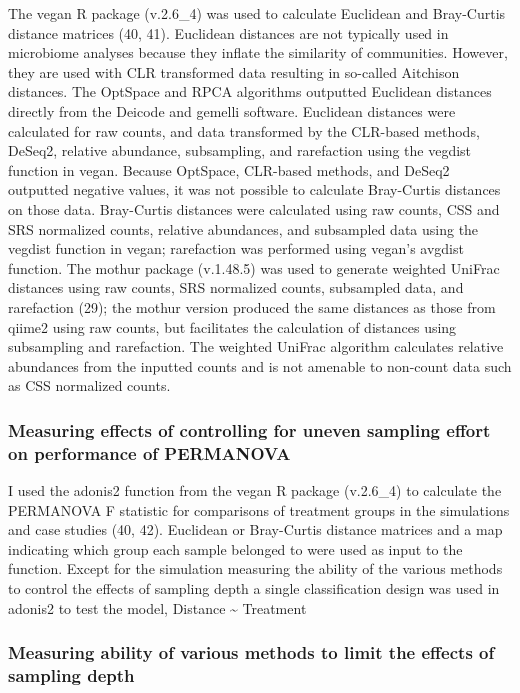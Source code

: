 \documentclass[
  11pt,
]{article}
\begin{document}
The vegan R package (v.2.6\_4) was used to calculate Euclidean and
Bray-Curtis distance matrices (40, 41). Euclidean distances are not
typically used in microbiome analyses because they inflate the
similarity of communities. However, they are used with CLR transformed
data resulting in so-called Aitchison distances. The OptSpace and RPCA
algorithms outputted Euclidean distances directly from the Deicode and
gemelli software. Euclidean distances were calculated for raw counts,
and data transformed by the CLR-based methods, DeSeq2, relative
abundance, subsampling, and rarefaction using the vegdist function in
vegan. Because OptSpace, CLR-based methods, and DeSeq2 outputted
negative values, it was not possible to calculate Bray-Curtis distances
on those data. Bray-Curtis distances were calculated using raw counts,
CSS and SRS normalized counts, relative abundances, and subsampled data
using the vegdist function in vegan; rarefaction was performed using
vegan's avgdist function. The mothur package (v.1.48.5) was used to
generate weighted UniFrac distances using raw counts, SRS normalized
counts, subsampled data, and rarefaction (29); the mothur version
produced the same distances as those from qiime2 using raw counts, but
facilitates the calculation of distances using subsampling and
rarefaction. The weighted UniFrac algorithm calculates relative
abundances from the inputted counts and is not amenable to non-count
data such as CSS normalized counts.

\subsubsection{Measuring effects of controlling for uneven sampling
effort on performance of
PERMANOVA}\label{measuring-effects-of-controlling-for-uneven-sampling-effort-on-performance-of-permanova}

I used the adonis2 function from the vegan R package (v.2.6\_4) to
calculate the PERMANOVA F statistic for comparisons of treatment groups
in the simulations and case studies (40, 42). Euclidean or Bray-Curtis
distance matrices and a map indicating which group each sample belonged
to were used as input to the function. Except for the simulation
measuring the ability of the various methods to control the effects of
sampling depth a single classification design was used in adonis2 to
test the model, Distance \textasciitilde{} Treatment

\subsubsection{Measuring ability of various methods to limit the effects
of sampling
depth}\label{measuring-ability-of-various-methods-to-limit-the-effects-of-sampling-depth}
\end{document}
